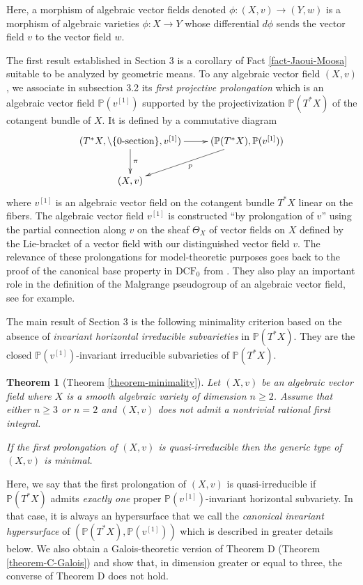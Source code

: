 \documentclass[12pt]{amsart}
\renewcommand{\P}{\mathbb{P}}
\theoremstyle{definition}
\theoremstyle{plain}
\theoremstyle{exampstyle}
\newtheorem{thmx}{Theorem}
\theoremstyle{exampstyle}\newtheorem{thmxbis}{Theorem}
\numberwithin{equation}{section}
\theoremstyle{remark}
\begin{document}
Here, a morphism of algebraic vector fields denoted $\phi : (X,v) \rightarrow (Y,w)$ is a morphism of algebraic varieties $\phi : X \rightarrow Y$ whose differential $d\phi$ sends the vector field $v$ to the vector field $w$. 

The first result established in Section 3 is a corollary of Fact \ref{fact-Jaoui-Moosa} suitable to be analyzed by geometric means. To any algebraic vector field $(X,v)$, we associate in subsection 3.2 its {\em first projective prolongation} which is an algebraic vector field $\P(v^{[1]})$ supported by the projectivization $\P(T^\ast X)$ of the cotangent bundle of $X$. It is defined by a commutative diagram 
$$\xymatrix{ (T^\ast X, \setminus \lbrace 0\text{-section} \rbrace ,v^{[1]})  \ar[d]^\pi \ar[r] & (\P(T^\ast X), \P(v^{[1]})) \ar[ld]^p \\ 
(X,v)
 }$$
where $v^{[1]}$ is an algebraic vector field on the cotangent bundle $T^\ast X$ linear on the fibers. The algebraic vector field $v^{[1]}$ is constructed ``by prolongation of $v$'' using  the partial connection along $v$ on the sheaf $\Theta_X$ of vector fields on $X$ defined by the Lie-bracket of a vector field with our distinguished vector field $v$. The relevance of these prolongations for model-theoretic purposes goes back to the proof of the canonical base property in $\mathrm{DCF}_0$ from  \cite{Pillay-Ziegler}. They also play an important role in the definition of the Malgrange pseudogroup of an algebraic vector field, see \cite{Casale-Davy} for example.

The main result of Section 3 is the following minimality criterion based on the absence of  {\em invariant horizontal irreducible subvarieties} in $\P(T^\ast X)$. They are  the  closed  $\P(v^{[1]})$-invariant irreducible subvarieties of $\P(T^\ast X)$.

\begin{thmx}[Theorem \ref{theorem-minimality}]\label{theoremC}
Let $(X,v)$ be an algebraic vector field where $X$ is a smooth algebraic variety of dimension $n \geq 2$. Assume that  either $n \geq 3$ or $n = 2$ and $(X,v)$ does not admit a nontrivial rational first integral. 

If the first prolongation of $(X,v)$ is {\em quasi-irreducible} then the generic type of $(X,v)$ is minimal. 
\end{thmx} 

Here, we say that the first prolongation of $(X,v)$ is quasi-irreducible if $\P(T^\ast X)$ admits {\em exactly one} proper $\P(v^{[1]})$-invariant horizontal subvariety. In that case, it is always an hypersurface that we call the {\em canonical invariant hypersurface} of $(\P(T^\ast X), \P(v^{[1]}))$ which is described in greater details below.  We also obtain a Galois-theoretic version of Theorem D (Theorem \ref{theorem-C-Galois}) and show that, in dimension greater or equal to three, the converse of Theorem D does not hold. 
\end{document}
